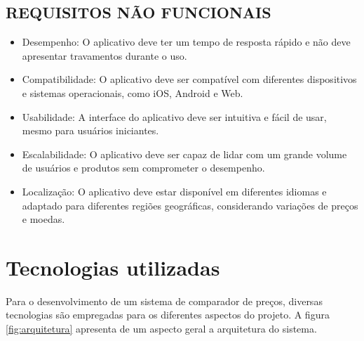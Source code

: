 \subsection{REQUISITOS NÃO FUNCIONAIS}
\begin{itemize}
  \item Desempenho: O aplicativo deve ter um tempo de resposta rápido e não deve apresentar travamentos durante o uso.
  \item Compatibilidade: O aplicativo deve ser compatível com diferentes dispositivos e sistemas operacionais, como iOS, Android e Web.
  \item Usabilidade: A interface do aplicativo deve ser intuitiva e fácil de usar, mesmo para usuários iniciantes.
  \item Escalabilidade: O aplicativo deve ser capaz de lidar com um grande volume de usuários e produtos sem comprometer o desempenho.
  \item Localização: O aplicativo deve estar disponível em diferentes idiomas e adaptado para diferentes regiões geográficas, considerando variações de preços e moedas.
\end{itemize}


\section{Tecnologias utilizadas} \label{sec:tecnologias}

Para o desenvolvimento de um sistema de comparador de preços, diversas tecnologias são empregadas para os diferentes aspectos do projeto. A figura \autoref{fig:arquitetura} apresenta de um aspecto geral a arquitetura do sistema.


